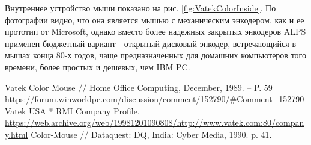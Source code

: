 \documentclass[11pt, a4paper]{article}
\begin{document}
Внутреннее устройство мыши показано на рис. \ref{fig:VatekColorInside}. По фотографии видно, что она является мышью с механическим энкодером, как и ее прототип от Microsoft, однако вместо более надежных закрытых энкодеров ALPS применен бюджетный вариант - открытый дисковый энкодер, встречающийся в мышах конца 80-х годов, чаще предназначенных для домашних компьютеров того времени, более простых и дешевых, чем IBM PC.

\begin{thebibliography}{9}
 Vatek Color Mouse // Home Office Computing, December, 1989. -- P. 59 \url{https://forum.winworldpc.com/discussion/comment/152790/#Comment_152790}
 Vatek USA * RMI Company Profile. \url{https://web.archive.org/web/19981201090808/http://www.vatek.com:80/company.html}
 Color-Mouse // Dataquest: DQ, India: Cyber Media, 1990. p. 41.
\end{thebibliography}
\end{document}
